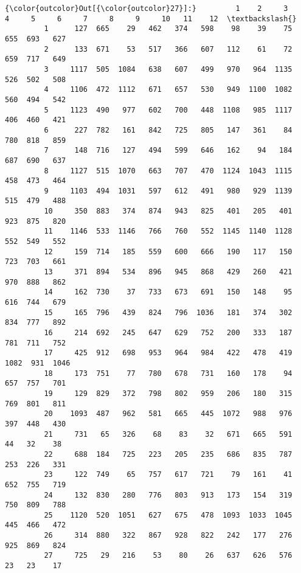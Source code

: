 \documentclass[11pt]{article}
\begin{document}
\begin{Verbatim}[commandchars=\\\{\}]
{\color{outcolor}Out[{\color{outcolor}27}]:}         1    2     3     4     5     6     7     8     9     10   11    12  \textbackslash{}
         1      127  665    29   462   374   598    98    39    75   655  693   627   
         2      133  671    53   517   366   607   112    61    72   659  717   649   
         3     1117  505  1084   638   607   499   970   964  1135   526  502   508   
         4     1106  472  1112   671   657   530   949  1100  1082   560  494   542   
         5     1123  490   977   602   700   448  1108   985  1117   406  460   421   
         6      227  782   161   842   725   805   147   361    84   780  818   859   
         7      148  716   127   494   599   646   162    94   184   687  690   637   
         8     1127  515  1070   663   707   470  1124  1043  1115   458  473   464   
         9     1103  494  1031   597   612   491   980   929  1139   515  479   488   
         10     350  883   374   874   943   825   401   205   401   923  875   820   
         11    1146  533  1146   766   760   552  1145  1140  1128   552  549   552   
         12     159  714   185   559   600   666   190   117   150   723  703   661   
         13     371  894   534   896   945   868   429   260   421   970  888   862   
         14     162  730    37   733   673   691   150   148    95   616  744   679   
         15     165  796   439   824   796  1036   181   374   302   834  777   892   
         16     214  692   245   647   629   752   200   333   187   781  711   752   
         17     425  912   698   953   964   984   422   478   419  1082  931  1046   
         18     173  751    77   780   678   731   160   178    94   657  757   701   
         19     129  829   372   798   802   959   206   180   315   769  801   811   
         20    1093  487   962   581   665   445  1072   988   976   397  448   430   
         21     731   65   326    68    83    32   671   665   591    44   32    38   
         22     688  184   725   223   205   235   686   835   787   253  226   331   
         23     122  749    65   757   617   721    79   161    41   652  755   719   
         24     132  830   280   776   803   913   173   154   319   750  809   788   
         25    1120  520  1051   627   675   478  1093  1033  1045   445  466   472   
         26     314  880   322   867   928   822   242   177   276   925  869   824   
         27     725   29   216    53    80    26   637   626   576    23   23    17   

\end{Verbatim}
\end{document}
